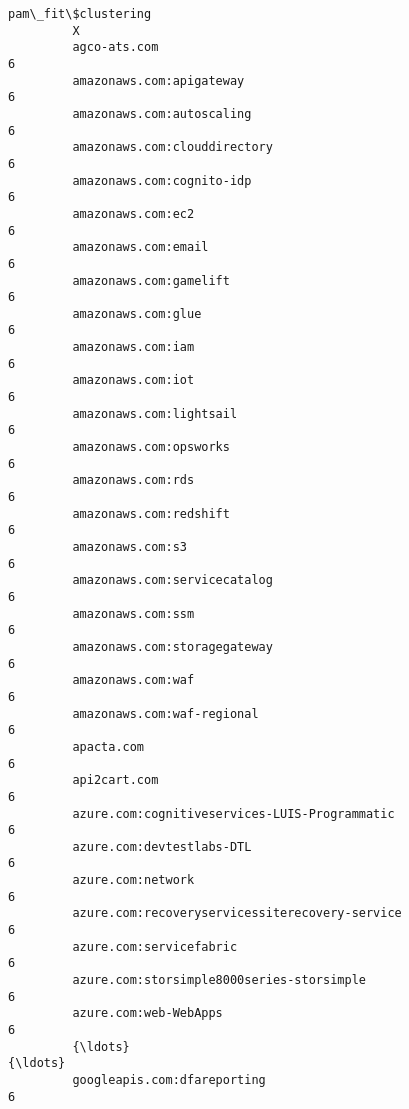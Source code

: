 \documentclass[11pt]{article}
\begin{document}
\begin{Verbatim}[commandchars=\\\{\}]
                                                         pam\_fit\$clustering  
         X                                                                   
         agco-ats.com                                                     6  
         amazonaws.com:apigateway                                         6  
         amazonaws.com:autoscaling                                        6  
         amazonaws.com:clouddirectory                                     6  
         amazonaws.com:cognito-idp                                        6  
         amazonaws.com:ec2                                                6  
         amazonaws.com:email                                              6  
         amazonaws.com:gamelift                                           6  
         amazonaws.com:glue                                               6  
         amazonaws.com:iam                                                6  
         amazonaws.com:iot                                                6  
         amazonaws.com:lightsail                                          6  
         amazonaws.com:opsworks                                           6  
         amazonaws.com:rds                                                6  
         amazonaws.com:redshift                                           6  
         amazonaws.com:s3                                                 6  
         amazonaws.com:servicecatalog                                     6  
         amazonaws.com:ssm                                                6  
         amazonaws.com:storagegateway                                     6  
         amazonaws.com:waf                                                6  
         amazonaws.com:waf-regional                                       6  
         apacta.com                                                       6  
         api2cart.com                                                     6  
         azure.com:cognitiveservices-LUIS-Programmatic                    6  
         azure.com:devtestlabs-DTL                                        6  
         azure.com:network                                                6  
         azure.com:recoveryservicessiterecovery-service                   6  
         azure.com:servicefabric                                          6  
         azure.com:storsimple8000series-storsimple                        6  
         azure.com:web-WebApps                                            6  
         {\ldots}                                                            {\ldots}  
         googleapis.com:dfareporting                                      6  

\end{Verbatim}
\end{document}
